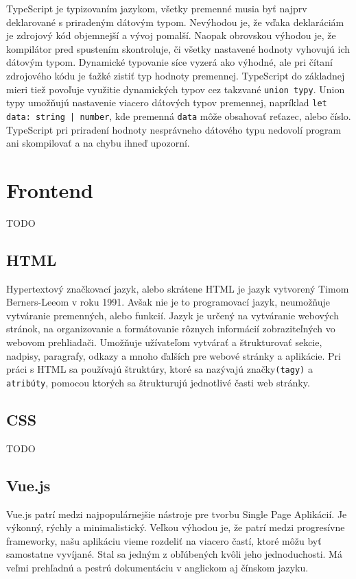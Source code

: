     TypeScript\cite{typescript} je typizovaním jazykom, všetky premenné musia byť najprv deklarované s priradeným dátovým typom. Nevýhodou je, že vďaka deklaráciám je zdrojový kód objemnejší a vývoj pomalší. Naopak obrovskou výhodou je, že kompilátor pred spustením skontroluje, či všetky nastavené hodnoty vyhovujú ich dátovým typom. Dynamické typovanie síce vyzerá ako výhodné, ale pri čítaní zdrojového kódu je ťažké zistiť typ hodnoty premennej. TypeScript do základnej mieri tiež povoľuje využitie dynamických typov cez takzvané \texttt{union typy}. Union typy umožňujú nastavenie viacero dátových typov premennej, napríklad \texttt{let data: string | number}, kde premenná \texttt{data} môže obsahovať reťazec, alebo číslo. TypeScript pri priradení hodnoty nesprávneho dátového typu nedovolí program ani skompilovať a na chybu ihneď upozorní.
\section{Frontend}
TODO

\subsection{HTML}
Hypertextový značkovací jazyk\cite{html}, alebo skrátene HTML je jazyk vytvorený Timom Berners-Leeom v roku 1991. Avšak nie je to programovací jazyk, neumožňuje vytváranie premenných, alebo funkcií. Jazyk je určený na vytváranie webových stránok, na organizovanie a formátovanie rôznych informácií zobraziteľných vo webovom prehliadači. Umožňuje užívateľom vytvárať a štrukturovať sekcie, nadpisy, paragrafy, odkazy a mnoho ďalších pre webové stránky a aplikácie. Pri práci s HTML sa používajú štruktúry, ktoré sa nazývajú značky\texttt{(tagy)} a \texttt{atribúty}, pomocou ktorých sa štrukturujú jednotlivé časti web stránky. 

\subsection{CSS}
TODO

\subsection{Vue.js}
Vue.js\cite{vue-guide} patrí medzi najpopulárnejšie nástroje pre tvorbu Single Page Aplikácií. Je výkonný, rýchly a minimalistický. Veľkou výhodou je, že patrí medzi progresívne frameworky, našu aplikáciu vieme rozdeliť na viacero častí, ktoré môžu byť samostatne vyvíjané. Stal sa jedným z obľúbených kvôli jeho jednoduchosti. Má veľmi prehľadnú a pestrú dokumentáciu v anglickom aj čínskom jazyku.

